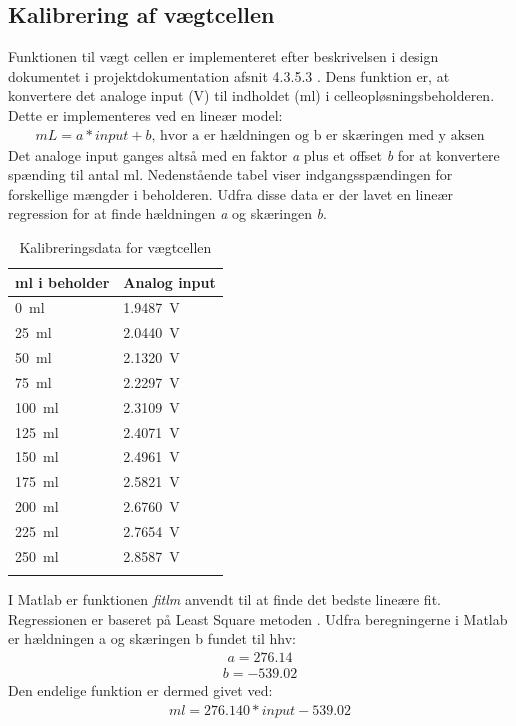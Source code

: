 \subsection{Kalibrering af vægtcellen}
Funktionen til vægt cellen er implementeret efter beskrivelsen i design dokumentet i projektdokumentation afsnit 4.3.5.3 . Dens funktion er, at konvertere det analoge input (V) til indholdet (ml) i celleopløsningsbeholderen. Dette er implementeres ved en lineær model:
\begin{align}
mL = a*input+b \text{, hvor a er hældningen og b er skæringen med y aksen}
\end{align}
Det analoge input ganges altså med en faktor \textit{a} plus et offset \textit{b} for at konvertere spænding til antal ml. Nedenstående tabel viser indgangsspændingen for forskellige mængder i beholderen. Udfra disse data er der lavet en lineær regression for at finde hældningen \textit{a} og skæringen \textit{b}.
\begin{center}
		\begin{longtable}{ | m{3cm} | m{3cm}| } 
			\hline
			\textbf{ml i beholder} &\textbf{Analog input} \\ 
			\hline
			 \SI{0}{\milli\litre} & \SI{1.9487}{\volt} \\ 
			\hline
			 \SI{25}{\milli\litre} & \SI{2.0440}{\volt} \\ 
			\hline
			\SI{50}{\milli\litre} & \SI{2.1320}{\volt} \\ 
			\hline
			\SI{75}{\milli\litre} & \SI{2.2297}{\volt} \\ 
			\hline
			\SI{100}{\milli\litre} & \SI{2.3109}{\volt} \\ 
			\hline
			\SI{125}{\milli\litre} & \SI{2.4071}{\volt} \\ 
			\hline
			\SI{150}{\milli\litre} & \SI{2.4961}{\volt} \\ 
			\hline
			\SI{175}{\milli\litre} & \SI{2.5821}{\volt} \\ 
			\hline
			\SI{200}{\milli\litre} & \SI{2.6760}{\volt} \\ 
			\hline
			\SI{225}{\milli\litre} & \SI{2.7654}{\volt} \\ 
			\hline
			\SI{250}{\milli\litre} & \SI{2.8587}{\volt} \\ 
			\hline
			\caption{Kalibreringsdata for vægtcellen}
			 		\end{longtable}
\end{center}

I Matlab er funktionen \textit{fitlm} anvendt til at finde det bedste lineære fit. Regressionen er baseret på Least Square metoden \citep{least}.
Udfra beregningerne i Matlab er hældningen a og skæringen b fundet til hhv:
\begin{align}
a = 276.14
\end{align}
\begin{align}
b = -539.02
\end{align}
Den endelige funktion er dermed givet ved:
\begin{align}
ml = 276.140*input-539.02
\end{align}

